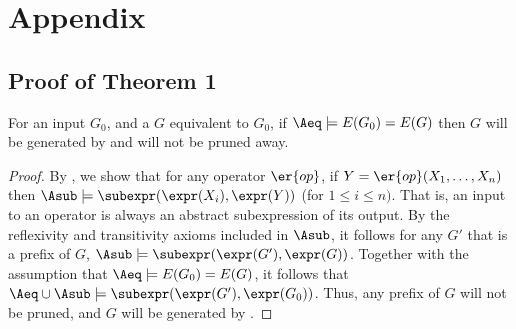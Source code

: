 \section{Appendix}
\label{sec:appendix}

\subsection{Proof of Theorem 1}

\begin{theorem}
\label{append:thm:pruning}
For an input \graph $G_0$, and a \graph $G$ equivalent to $G_0$,
if $\Aeq \models E(G_0) = E(G)$ then $G$ will be generated by  and will not be pruned away.
\end{theorem}

\begin{proof}
By , we show that for any operator $\er{op}$, if $Y = \er{op}(X_1,\ldots,X_n)$ then 
$\Asub \models \subexpr(\expr(X_i), \expr(Y))$ (for $1 \leq i \leq n)$.
That is, an input to an operator is always an abstract subexpression of its output.
By the reflexivity and transitivity axioms included in $\Asub$,
it follows for any $G'$ that is a prefix of $G$, $\Asub \models \subexpr(\expr(G'),\expr(G))$.
Together with the assumption that $\Aeq \models E(G_0) = E(G)$,
it follows that $\Aeq \cup \Asub \models \subexpr(\expr(G'),\expr(G_0))$.
Thus, any prefix of $G$ will not be pruned, and $G$ will be generated by \sys.
\end{proof}
